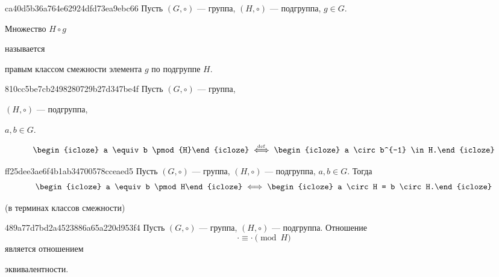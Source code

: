 \begin{note}{ca40d5b36a764e62924dfd73ea9ebc66}
    Пусть \({ (G, \circ) }\) --- группа, \({ (H, \circ) }\) --- подгруппа,\: \({ g \in G }\).
    \begin{icloze}{2}Множество \({ H \circ g }\)\end{icloze} называется \begin{icloze}{1}правым классом смежности элемента \({ g }\) по подгруппе \({ H }\).\end{icloze}
\end{note}

\begin{note}{810cc5be7cb2498280729b27d347be4f}
    Пусть \({ (G, \circ) }\) --- группа, \begin{icloze}{3}\({ (H, \circ) }\) --- подгруппа,\end{icloze}\: \begin{icloze}{4}\({ a, b \in G }\).\end{icloze}
    \[
        \begin{icloze}{2}a \equiv b \pmod{H}\end{icloze} \overset{\hspace{-1pt}\text{\tiny def}}\iff \begin{icloze}{1}a \circ b^{-1} \in H.\end{icloze}
    \]
\end{note}

\begin{note}{ff25dee3ae6f4b1ab34700578cceaed5}
    Пусть \({ (G, \circ) }\) --- группа, \({ (H, \circ) }\) --- подгруппа,\: \({ a, b \in G }\).
    Тогда
    \[
        \begin{icloze}{2}a \equiv b \pmod H\end{icloze} \iff \begin{icloze}{1}a \circ H = b \circ H.\end{icloze}
    \]

    \begin{center}
        \tiny
        (в терминах классов смежности)
    \end{center}
\end{note}

\begin{note}{489a77d7bd2a4523886a65a220d953f4}
    Пусть \({ (G, \circ) }\) --- группа, \({ (H, \circ) }\) --- подгруппа.
    Отношение
    \[
        \cdot \equiv \cdot \pmod{H}
    \]
    является отношением \begin{icloze}{1}эквивалентности.\end{icloze}
\end{note}

